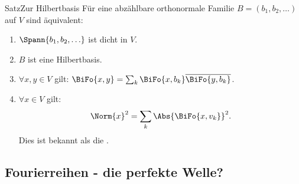 \begin{Satz}
{Satz}{Zur Hilbertbasis}
Für eine abzählbare orthonormale Familie $B=(b_1,b_2,\ldots)$ auf $V$ sind äquivalent:
\begin{enumerate}
    \item $\Spann{b_1,b_2,\ldots}$ ist dicht in $V$.\\
    \item $B$ ist eine Hilbertbasis.\\
    \item $\forall x,y\in V$ gilt: $\BiFo{x,y}=\sum_{k}\BiFo{x,b_k}\overline{\BiFo{y,b_k}}$.
    \item $\forall x\in V$ gilt:
    \begin{equation}
        \Norm{x}^2=\sum_k\Abs{\BiFo{x,v_k}}^2.
    \end{equation}
    Dies ist bekannt als die .
\end{enumerate}
\end{Satz}

\subsection{Fourierreihen - die perfekte Welle?}
